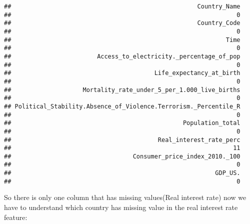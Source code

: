 \documentclass[
]{article}
\newenvironment{Shaded}{\begin{snugshade}}{\end{snugshade}}
\newcommand{\CommentTok}[1]{\textcolor[rgb]{0.56,0.35,0.01}{\textit{#1}}}
\newcommand{\FunctionTok}[1]{\textcolor[rgb]{0.13,0.29,0.53}{\textbf{#1}}}
\newcommand{\NormalTok}[1]{#1}
\newcommand{\OtherTok}[1]{\textcolor[rgb]{0.56,0.35,0.01}{#1}}
\newcommand{\SpecialCharTok}[1]{\textcolor[rgb]{0.81,0.36,0.00}{\textbf{#1}}}
\begin{document}
\begin{verbatim}
##                                                    Country_Name 
##                                                               0 
##                                                    Country_Code 
##                                                               0 
##                                                            Time 
##                                                               0 
##                        Access_to_electricity._percentage_of_pop 
##                                                               0 
##                                        Life_expectancy_at_birth 
##                                                               0 
##                    Mortality_rate_under_5_per_1.000_live_births 
##                                                               0 
## Political_Stability.Absence_of_Violence.Terrorism._Percentile_R 
##                                                               0 
##                                                Population_total 
##                                                               0 
##                                         Real_interest_rate_perc 
##                                                              11 
##                                  Consumer_price_index_2010._100 
##                                                               0 
##                                                         GDP_US. 
##                                                               0
\end{verbatim}

So there is only one column that has missing values(Real interest rate)
now we have to understand which country has missing value in the real
interest rate feature:

\begin{Shaded}
\end{Shaded}
\end{document}
